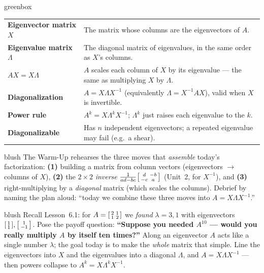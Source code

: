 \documentclass[10pt]{article}
\begin{document}
\begin{skillbox}{greenbox}
\renewcommand{\arraystretch}{1.3}
\begin{tabularx}{\linewidth}{@{}l X@{}}
\textbf{Eigenvector matrix $X$} & The matrix whose columns are the eigenvectors of $A$. \\
\textbf{Eigenvalue matrix $\Lambda$} & The diagonal matrix of eigenvalues, in the same order as $X$'s columns. \\
\textbf{$AX=X\Lambda$} & $A$ scales each column of $X$ by its eigenvalue --- the same as multiplying $X$ by $\Lambda$. \\
\textbf{Diagonalization} & $A=X\Lambda X^{-1}$ (equivalently $\Lambda=X^{-1}AX$), valid when $X$ is invertible. \\
\textbf{Power rule} & $A^k=X\Lambda^k X^{-1}$; $\Lambda^k$ just raises each eigenvalue to the $k$. \\
\textbf{Diagonalizable} & Has $n$ independent eigenvectors; a repeated eigenvalue may fail (e.g.\ a shear). \\
\end{tabularx}
\end{skillbox}

\begin{fixedskillbox}{blush}
    The Warm-Up rehearses the three moves that \emph{assemble} today's factorization:
    \textbf{(1)} building a matrix from column vectors (eigenvectors $\to$ columns of $X$),
    \textbf{(2)} the $2\times2$ \emph{inverse} $\frac{1}{ad-bc}\begin{bsmallmatrix}d&-b\\-c&a\end{bsmallmatrix}$
    (Unit~2, for $X^{-1}$), and \textbf{(3)} right-multiplying by a \emph{diagonal} matrix (which scales the
    columns). Debrief by naming the plan aloud: ``today we combine these three moves into
    $A=X\Lambda X^{-1}$.''
\end{fixedskillbox}

\begin{skillbox}[Hook]{blush}
    Recall Lesson~6.1: for $A=\begin{bsmallmatrix}2&1\\1&2\end{bsmallmatrix}$ we \emph{found}
    $\lambda=3,1$ with eigenvectors $\begin{bsmallmatrix}1\\1\end{bsmallmatrix},\begin{bsmallmatrix}1\\-1\end{bsmallmatrix}$.
    Pose the payoff question: \textbf{``Suppose you needed $A^{10}$ --- would you really multiply $A$ by
    itself ten times?''} Along an eigenvector $A$ acts like a single number $\lambda$; the goal today is to
    make the \emph{whole} matrix that simple. Line the eigenvectors into $X$ and the eigenvalues into a
    diagonal $\Lambda$, and $A=X\Lambda X^{-1}$ --- then powers collapse to $A^k=X\Lambda^k X^{-1}$.
\end{skillbox}
\end{document}
